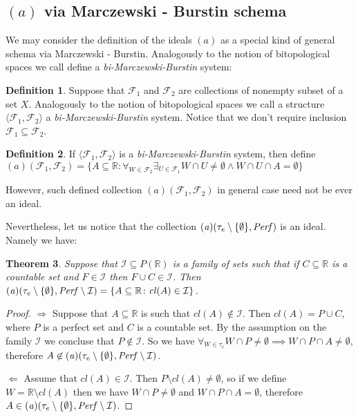 \documentclass[12pt]{amsart}
\theoremstyle{plain}
\newtheorem{theorem}{Theorem}[section]
\theoremstyle{definition}
\newtheorem{definition}[theorem]{Definition}
\theoremstyle{remark}
\newcommand{\cl}{\mathit{cl}}
\newcommand{\Perf}{{\it Perf}}
\newcommand{\real}{\mathbb{R}}
\newcommand{\cF}{{\mathcal F}}
\newcommand{\cI}{{\mathcal I}}
\newcommand{\aideal}{\mathit{(a)}}
\newcommand{\biMB}{bi-Marczewski-Burstin}
\begin{document}
\subsection{$\aideal$ via Marczewski - Burstin schema}

We may consider the definition of the ideals $\aideal$
as a special kind of general schema via Marczewski - Burstin.
Analogously to the notion of bitopological spaces we call define
a {\it\biMB{}} system:

\begin{definition}
Suppose that $\cF_1$ and $\cF_2$ are collections of nonempty
subset of a set $X$. 
Analogously to the notion of bitopological spaces we call a structure
$\langle \cF_1, \cF_2 \rangle$ a {\it\biMB{}} system.
Notice that we don't require inclusion $\cF_1 \subseteq \cF_2$.
\end{definition}

\begin{definition}
If $\langle \cF_1, \cF_2 \rangle$ is a {\it\biMB{}} system,
then define 
$\aideal(\cF_1, \cF_2) = \lbrace A \subseteq \real\colon 
\forall_{W\in \cF_2} \exists_{U \in \cF_1}
W \cap U \not= \emptyset \wedge W \cap U \cap A = \emptyset
\rbrace$ 
\end{definition}

However, such defined collection $\aideal(\cF_1, \cF_2)$
in general case need not be ever an ideal.

Nevertheless, let us notice that the collection
$\aideal(\tau_e\setminus\lbrace\emptyset\rbrace, \Perf)$ is an ideal. Namely we have:

\begin{theorem}
\label{theorem:a_tau_e_perf_i}
Suppose that $\cI \subseteq P(\real)$ is a family of sets such that 
if $C\subseteq \real$ is a countable set and $F\in\cI$ then $F \cup C \in \cI$. 
Then $\aideal(\tau_e\setminus\lbrace\emptyset\rbrace, \Perf\setminus\cI) = \lbrace A \subseteq \real \colon \cl(A) \in \cI \rbrace$.
\end{theorem}

\begin{proof}
$\Rightarrow$ Suppose that $A\subseteq \real$ is such that $\cl(A) \not\in\cI$. Then $\cl(A) = P \cup C$, where $P$ is a perfect set and $C$ is a countable set. By the assumption on the family $\cI$ we concluse that $P\not\in\cI$. So we have $\forall_{W \in \tau_e} W \cap P \not= \emptyset \implies W \cap P \cap A \not= \emptyset$, therefore $A \not\in \aideal(\tau_e\setminus\lbrace\emptyset\rbrace, \Perf\setminus\cI)$.

$\Leftarrow$ Assume that $\cl(A)\in\cI$. Then $P \setminus \cl(A) \not=\emptyset$, so if we define $W = \real\setminus\cl(A)$ then we have $W \cap P \not= \emptyset$ and $W \cap P \cap A = \emptyset$, therefore  
$A \in \aideal(\tau_e\setminus\lbrace\emptyset\rbrace, \Perf\setminus\cI)$.
\end{proof}
\end{document}
